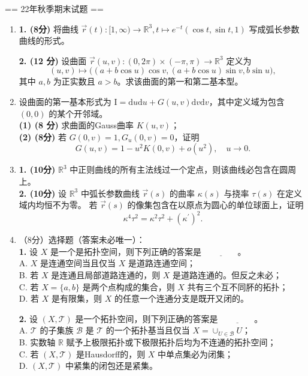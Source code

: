 == 22年秋季期末试题 ==
\begin{enumerate}
\item[一] \textbf{1. (8分)} 将曲线 $\vec{r}(t):[1,\infty) \rightarrow \mathbb{R}^3, t \mapsto e^{-t}(\cos t,\sin t,1)$ 写成弧长参数曲线的形式。

\textbf{2. (12 分)} 设曲面 $\vec{r}(u,v):(0,2\pi) \times(-\pi,\pi) \rightarrow \mathbb{R}^3$ 定义为
\[(u,v) \mapsto \big((a+b \cos u) \cos v,(a+b \cos u) \sin v, b \sin u\big),\]
其中 $a,b$ 为正实数且 $a>b$。求该曲面的第一和第二基本型。

\item[二] 设曲面的第一基本形式为 $\mathrm{I}=\mathrm{d}u\mathrm{d}u+G(u,v)\mathrm{d}v\mathrm{d}v$，其中定义域为包含 $(0,0)$ 的某个开邻域。\\
\textbf{(1) (8 分)} 求曲面的Gauss曲率 $K(u,v)$；\\
\textbf{(2) (8分)} 若 $G(0,v)=1, G_u(0,v)=0$，证明\\
$$G(u,v)=1-u^2K(0,v)+o(u^2), \quad u \rightarrow 0.$$

\item[三] \textbf{1. (10分)} $\mathbb{R}^3$ 中正则曲线的所有主法线过一个定点，则该曲线必包含在圆周上。\\
\textbf{2. (10分)} 设 $\mathbb{R}^3$ 中弧长参数曲线 $\vec{r}(s)$ 的曲率 $\kappa(s)$ 与挠率 $\tau(s)$ 在定义域内均恒不为零。
若 $\vec{r}(s)$ 的像集包含在以原点为圆心的单位球面上，证明
\[\kappa^4 \tau^2=\kappa^2 \tau^2+(\kappa^{\prime})^2.\]

\item[四]（8分）选择题（答案未必唯一）：\\
\textbf{1.} 设 $X$ 是一个是拓扑空间，则下列正确的答案是 $\underline{\qquad\qquad}$。\\
A. $X$ 是连通空间当且仅当 $X$ 是道路连通空间；\\
B. 若 $X$ 是连通且局部道路连通的，则 $X$ 是道路连通的。但反之未必；\\
C. 若 $X=\{a,b\}$ 是两个点构成的集合，则 $X$ 共有三个互不同肧的拓扑；\\
D. 若 $X$ 是有限集，则 $X$ 的任意一个连通分支是既开又闭的。

\textbf{2.} 设 $(X,\mathcal{T})$ 是一个拓扑空间，则下列正确的答案是 $\underline{\qquad\qquad}$。\\
A. $\mathcal{T}$ 的子集族 $\mathcal{B}$ 是 $\mathcal{T}$ 的一个拓扑基当且仅当 $X=\cup_{U \in \mathcal{B}} U$；\\
B. 实数轴 $\mathbb{R}$ 赋予上极限拓扑或下极限拓扑后均为不连通的拓扑空间；\\
C. 若 $(X,\mathcal{T})$ 是Hausdorff的，则 $X$ 中单点集必为闭集；\\
D. $(X,\mathcal{T})$ 中紧集的闭包还是紧集。


\end{enumerate}

